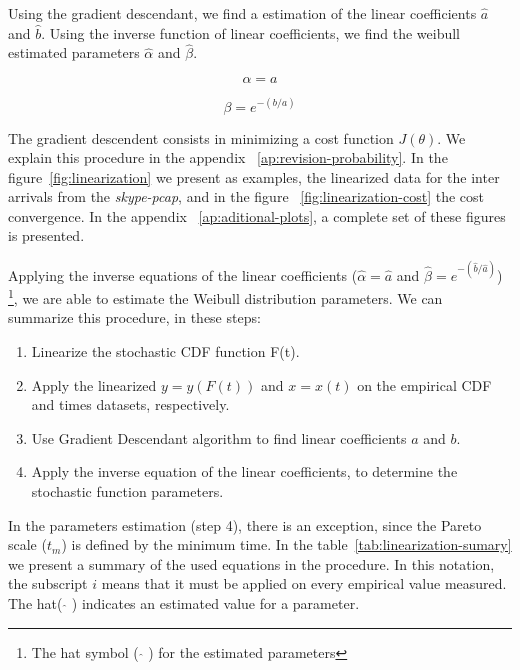 Using the gradient descendant, we find a estimation of the linear coefficients $\hat{a}$ and $\hat{b}$. Using the inverse function of linear coefficients, we find the weibull estimated parameters $\hat{\alpha}$ and $\hat{\beta}$.

\begin{equation}
\alpha = a
\end{equation}

\begin{equation}
\beta = e^{-(b/a)}
\end{equation}

The gradient descendent consists in minimizing a cost function $J(\theta)$. We explain this procedure in the appendix ~\ref{ap:revision-probability}. In the figure~\ref{fig:linearization} we present as examples, the linearized data for the inter arrivals from the \textit{skype-pcap}, and in the figure ~\ref{fig:linearization-cost} the cost convergence. In the appendix ~\ref{ap:aditional-plots}, a complete set of these figures is presented.

Applying the inverse equations of the linear coefficients ($\hat{\alpha} = \hat{a}$ and $\hat{\beta} = e^{-(\hat{b}/\hat{a})}$) \footnote{The hat symbol ( $ \widehat{} $ ) for the estimated parameters}, we are able to estimate the Weibull distribution parameters. We can summarize this procedure, in these steps:
\begin{enumerate}
\item Linearize the stochastic CDF function F(t).
\item Apply the linearized $y = y(F(t))$ and  $x = x(t)$ on the empirical CDF and times datasets, respectively. 
\item Use Gradient Descendant algorithm to find linear coefficients $a$ and $b$.
\item Apply the inverse equation of the linear coefficients, to determine the stochastic function parameters.
\end{enumerate}

In the parameters estimation (step 4), there is an exception, since the Pareto scale ($t_{m}$) is defined by the minimum time. In the table~\ref{tab:linearization-sumary} we present a summary of the used equations in the procedure. In this notation, the subscript $i$ means that it must be applied on every empirical value measured. The hat( $\widehat{}$ ) indicates an estimated value for a parameter. 

